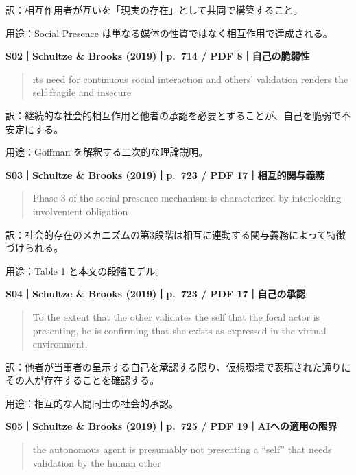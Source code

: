\documentclass[
  11pt,
  a4paper,
]{article}
\begin{document}
訳：相互作用者が互いを「現実の存在」として共同で構築すること。

用途：Social Presence は単なる媒体の性質ではなく相互作用で達成される。


\textbf{S02｜Schultze \& Brooks (2019)｜p.~714 / PDF 8｜自己の脆弱性}

\begin{quote}
its need for continuous social interaction and others' validation
renders the self fragile and insecure
\end{quote}

訳：継続的な社会的相互作用と他者の承認を必要とすることが、自己を脆弱で不安定にする。

用途：Goffman を解釈する二次的な理論説明。


\textbf{S03｜Schultze \& Brooks (2019)｜p.~723 / PDF 17｜相互的関与義務}

\begin{quote}
Phase 3 of the social presence mechanism is characterized by
interlocking involvement obligation
\end{quote}

訳：社会的存在のメカニズムの第3段階は相互に連動する関与義務によって特徴づけられる。

用途：Table 1 と本文の段階モデル。


\textbf{S04｜Schultze \& Brooks (2019)｜p.~723 / PDF 17｜自己の承認}

\begin{quote}
To the extent that the other validates the self that the focal actor is
presenting, he is confirming that she exists as expressed in the virtual
environment.
\end{quote}

訳：他者が当事者の呈示する自己を承認する限り、仮想環境で表現された通りにその人が存在することを確認する。

用途：相互的な人間同士の社会的承認。


\textbf{S05｜Schultze \& Brooks (2019)｜p.~725 / PDF
19｜AIへの適用の限界}

\begin{quote}
the autonomous agent is presumably not presenting a ``self'' that needs
validation by the human other
\end{quote}
\end{document}

